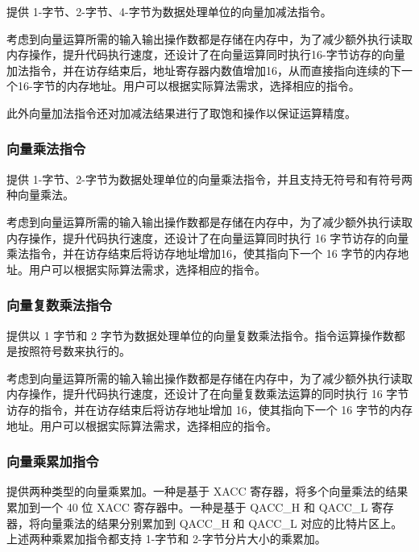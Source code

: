 \documentclass[main\_\_CN.tex]{subfiles}
\begin{document}
\chipname{}提供 1-字节、2-字节、4-字节为数据处理单位的向量加减法指令。

考虑到向量运算所需的输入输出操作数都是存储在内存中，为了减少额外执行读取内存操作，提升代码执行速度，还设计了在向量运算同时执行16-字节访存的向量加法指令，并在访存结束后，地址寄存器内数值增加16，从而直接指向连续的下一个16-字节的内存地址。用户可以根据实际算法需求，选择相应的指令。

此外向量加法指令还对加减法结果进行了取饱和操作以保证运算精度。



\subsubsection{向量乘法指令}

\chipname{} 提供 1-字节、2-字节为数据处理单位的向量乘法指令，并且支持无符号和有符号两种向量乘法。

考虑到向量运算所需的输入输出操作数都是存储在内存中，为了减少额外执行读取内存操作，提升代码执行速度，还设计了在向量运算同时执行 16 字节访存的向量乘法指令，并在访存结束后将访存地址增加16，使其指向下一个 16 字节的内存地址。用户可以根据实际算法需求，选择相应的指令。




\subsubsection{向量复数乘法指令}

\chipname{}提供以 1 字节和 2 字节为数据处理单位的向量复数乘法指令。指令运算操作数都是按照符号数来执行的。

考虑到向量运算所需的输入输出操作数都是存储在内存中，为了减少额外执行读取内存操作，提升代码执行速度，还设计了在向量复数乘法运算的同时执行 16 字节访存的指令，并在访存结束后将访存地址增加 16，使其指向下一个 16 字节的内存地址。用户可以根据实际算法需求，选择相应的指令。




\subsubsection{向量乘累加指令}

\chipname{} 提供两种类型的向量乘累加。一种是基于 XACC 寄存器，将多个向量乘法的结果累加到一个 40 位 XACC 寄存器中。一种是基于 QACC\_H 和 QACC\_L 寄存器，将向量乘法的结果分别累加到 QACC\_H 和 QACC\_L 对应的比特片区上。上述两种乘累加指令都支持 1-字节和 2-字节分片大小的乘累加。
\end{document}

